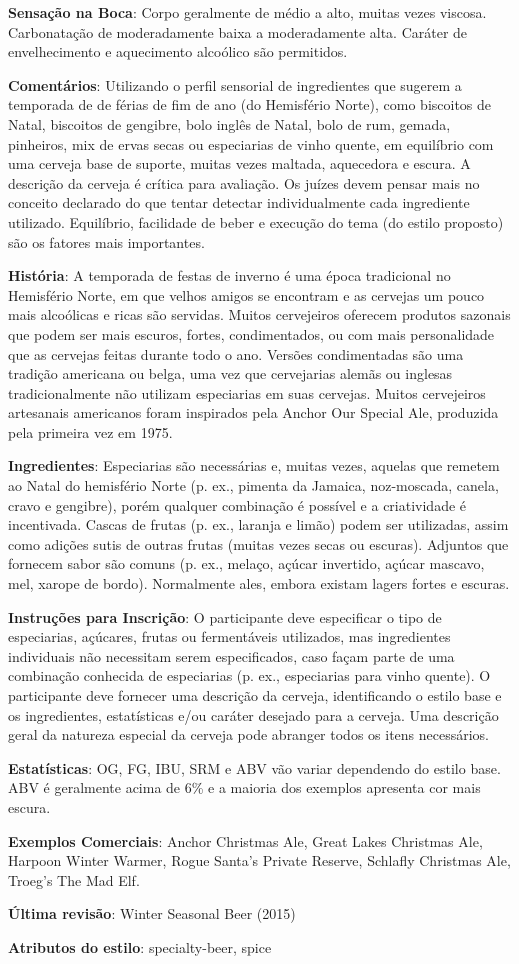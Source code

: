 \textbf{Sensação na Boca}: Corpo geralmente de médio a alto, muitas vezes viscosa. Carbonatação de moderadamente baixa a moderadamente alta. Caráter de envelhecimento e aquecimento alcoólico são permitidos.

\textbf{Comentários}: Utilizando o perfil sensorial de ingredientes que sugerem a temporada de de férias de fim de ano (do Hemisfério Norte), como biscoitos de Natal, biscoitos de gengibre, bolo inglês de Natal, bolo de rum, gemada, pinheiros, mix de ervas secas ou especiarias de vinho quente, em equilíbrio com uma cerveja base de suporte, muitas vezes maltada, aquecedora e escura. A descrição da cerveja é crítica para avaliação. Os juízes devem pensar mais no conceito declarado do que tentar detectar individualmente cada ingrediente utilizado. Equilíbrio, facilidade de beber e execução do tema (do estilo proposto) são os fatores mais importantes.

\textbf{História}: A temporada de festas de inverno é uma época tradicional no Hemisfério Norte, em que velhos amigos se encontram e as cervejas um pouco mais alcoólicas e ricas são servidas. Muitos cervejeiros oferecem produtos sazonais que podem ser mais escuros, fortes, condimentados, ou com mais personalidade que as cervejas feitas durante todo o ano. Versões condimentadas são uma tradição americana ou belga, uma vez que cervejarias alemãs ou inglesas tradicionalmente não utilizam especiarias em suas cervejas. Muitos cervejeiros artesanais americanos foram inspirados pela Anchor Our Special Ale, produzida pela primeira vez em 1975.

\textbf{Ingredientes}: Especiarias são necessárias e, muitas vezes, aquelas que remetem ao Natal do hemisfério Norte (p. ex., pimenta da Jamaica, noz-moscada, canela, cravo e gengibre), porém qualquer combinação é possível e a criatividade é incentivada. Cascas de frutas (p. ex., laranja e limão) podem ser utilizadas, assim como adições sutis de outras frutas (muitas vezes secas ou escuras). Adjuntos que fornecem sabor são comuns (p. ex., melaço, açúcar invertido, açúcar mascavo, mel, xarope de bordo). Normalmente ales, embora existam lagers fortes e escuras.

\textbf{Instruções para Inscrição}: O participante deve especificar o tipo de especiarias, açúcares, frutas ou fermentáveis utilizados, mas ingredientes individuais não necessitam serem especificados, caso façam parte de uma combinação conhecida de especiarias (p. ex., especiarias para vinho quente). O participante deve fornecer uma descrição da cerveja, identificando o estilo base e os ingredientes, estatísticas e/ou caráter desejado para a cerveja. Uma descrição geral da natureza especial da cerveja pode abranger todos os itens necessários.

\textbf{Estatísticas}: OG, FG, IBU, SRM e ABV vão variar dependendo do estilo base. ABV é geralmente acima de 6\% e a maioria dos exemplos apresenta cor mais escura.

\textbf{Exemplos Comerciais}: Anchor Christmas Ale, Great Lakes Christmas Ale, Harpoon Winter Warmer, Rogue Santa's Private Reserve, Schlafly Christmas Ale, Troeg's The Mad Elf.

\textbf{Última revisão}: Winter Seasonal Beer (2015)

\textbf{Atributos do estilo}: specialty-beer, spice
